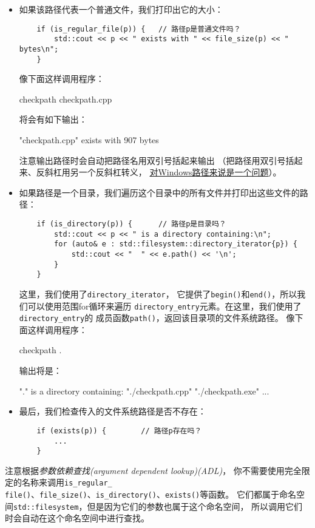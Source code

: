 \begin{itemize}
    \item 如果该路径代表一个普通文件，我们打印出它的大小：
    \begin{lstlisting}
    if (is_regular_file(p)) {   // 路径p是普通文件吗？
        std::cout << p << " exists with " << file_size(p) << " bytes\n";
    }
    \end{lstlisting}
    像下面这样调用程序：
    \begin{blacklisting}
        checkpath checkpath.cpp
    \end{blacklisting}
    将会有如下输出：
    \begin{blacklisting}
        "checkpath.cpp" exists with 907 bytes
    \end{blacklisting}
    注意输出路径时会自动把路径名用双引号括起来输出
    （把路径用双引号括起来、反斜杠用另一个反斜杠转义，
    \hyperref[ch20.1.1.1]{对Windows路径来说是一个问题}）。
    \item 如果路径是一个目录，我们遍历这个目录中的所有文件并打印出这些文件的路径：
    \begin{lstlisting}
    if (is_directory(p)) {      // 路径p是目录吗？
        std::cout << p << " is a directory containing:\n";
        for (auto& e : std::filesystem::directory_iterator{p}) {
            std::cout << "  " << e.path() << '\n';
        }
    }
    \end{lstlisting}
    这里，我们使用了\texttt{directory\_iterator}，
    它提供了\texttt{begin()}和\texttt{end()}，所以我们可以使用范围for循环来遍历
    \texttt{directory\_entry}元素。在这里，我们使用了\texttt{directory\_entry}的
    成员函数\texttt{path()}，返回该目录项的文件系统路径。
    像下面这样调用程序：
    \begin{blacklisting}
        checkpath .
    \end{blacklisting}
    输出将是：
    \begin{blacklisting}
        "." is a directory containing:
        "./checkpath.cpp"
        "./checkpath.exe"
        ...
    \end{blacklisting}
    \item 最后，我们检查传入的文件系统路径是否不存在：
    \begin{lstlisting}
    if (exists(p)) {        // 路径p存在吗？
        ...
    }
    \end{lstlisting}
\end{itemize}
注意根据\emph{参数依赖查找(argument dependent lookup)(ADL)}，
你不需要使用完全限定的名称来调用\texttt{is\_regular\_\\
file()}、\texttt{file\_size()}、\texttt{is\_directory()}、\texttt{exists()}等函数。
它们都属于命名空间\texttt{std::filesystem}，但是因为它们的参数也属于这个命名空间，
所以调用它们时会自动在这个命名空间中进行查找。

